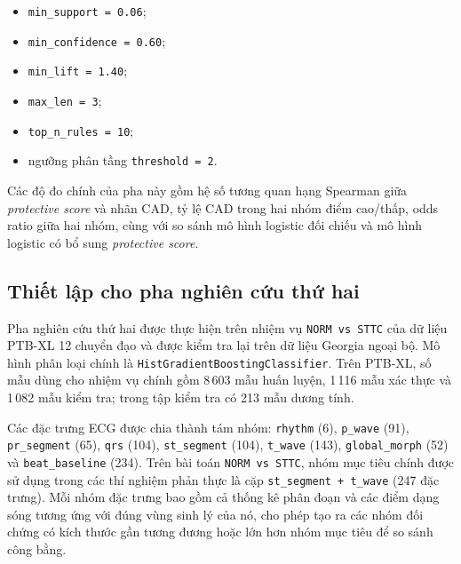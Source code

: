 \renewcommand{\labelitemi}{$+$}
\begin{itemize}
	\item \texttt{min\_support = 0.06};
	\item \texttt{min\_confidence = 0.60};
	\item \texttt{min\_lift = 1.40};
	\item \texttt{max\_len = 3};
	\item \texttt{top\_n\_rules = 10};
	\item ngưỡng phân tầng \texttt{threshold = 2}.
\end{itemize}

\blocksep

Các độ đo chính của pha này gồm hệ số tương quan hạng Spearman giữa \textit{protective score} và nhãn CAD, tỷ lệ CAD trong hai nhóm điểm cao/thấp, odds ratio giữa hai nhóm, cùng với so sánh mô hình logistic đối chiếu và mô hình logistic có bổ sung \textit{protective score}.

\blocksep

\subsection{Thiết lập cho pha nghiên cứu thứ hai}

\blocksep

Pha nghiên cứu thứ hai được thực hiện trên nhiệm vụ \texttt{NORM vs STTC} của dữ liệu PTB-XL 12 chuyển đạo và được kiểm tra lại trên dữ liệu Georgia ngoại bộ. Mô hình phân loại chính là \texttt{HistGradient\discretionary{}{}{}Boosting\discretionary{}{}{}Classifier}. Trên PTB-XL, số mẫu dùng cho nhiệm vụ chính gồm 8\,603 mẫu huấn luyện, 1\,116 mẫu xác thực và 1\,082 mẫu kiểm tra; trong tập kiểm tra có 213 mẫu dương tính.

\blocksep

Các đặc trưng ECG được chia thành tám nhóm: \texttt{rhythm} (6), \texttt{p\_wave} (91), \texttt{pr\_segment} (65), \texttt{qrs} (104), \texttt{st\_segment} (104), \texttt{t\_wave} (143), \texttt{global\_morph} (52) và \texttt{beat\_baseline} (234). Trên bài toán \texttt{NORM vs STTC}, nhóm mục tiêu chính được sử dụng trong các thí nghiệm phản thực là cặp \texttt{st\_segment + t\_wave} (247 đặc trưng). Mỗi nhóm đặc trưng bao gồm cả thống kê phân đoạn và các điểm dạng sóng tương ứng với đúng vùng sinh lý của nó, cho phép tạo ra các nhóm đối chứng có kích thước gần tương đương hoặc lớn hơn nhóm mục tiêu để so sánh công bằng.

\blocksep

